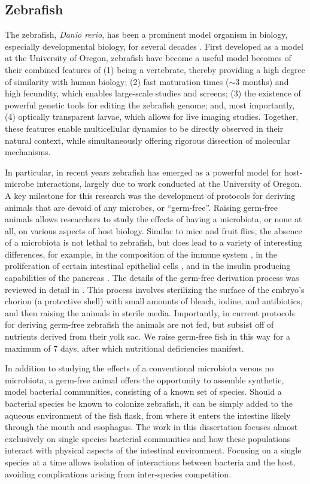 \subsection{Zebrafish}
The zebrafish, \textit{Danio rerio}, has been a prominent model organism in biology, especially developmental biology, for several decades \cite{streisinger1981production}. First developed as a model at the University of Oregon, zebrafish have become a useful model becomes of their combined features of (1) being a vertebrate, thereby providing a high degree of similarity with human biology; (2) fast maturation times ($\sim$3 months) and high fecundity, which enables large-scale studies and screens; (3) the existence of powerful genetic tools for editing the zebrafish genome; and, most importantly, (4) optically transparent larvae, which allows for live imaging studies. Together, these features enable multicellular dynamics to be directly observed in their natural context, while simultaneously offering rigorous dissection of molecular mechanisms. 

In particular, in recent years zebrafish has emerged as a powerful model for host-microbe interactions, largely due to work conducted at the University of Oregon. A key milestone for this research was the development of protocols for deriving animals that are devoid of any microbes, or “germ-free”. Raising germ-free animals allows researchers to study the effects of having a microbiota, or none at all, on various aspects of host biology. Similar to mice and fruit flies, the absence of a microbiota is not lethal to zebrafish, but does lead to a variety of interesting differences, for example, in the composition of the immune system \cite{rolig_individual_2015}, in the proliferation of certain intestinal epithelial cells \cite{bates2006distinct}, and in the insulin producing capabilities of the pancreas \cite{Hill2016}. The details of the germ-free derivation process was reviewed in detail in \cite{melancon_best_2017}. This process involves sterilizing the surface of the embryo's chorion (a protective shell) with small amounts of bleach, iodine, and antibiotics, and then raising the animals in sterile media. Importantly, in current protocols for deriving germ-free zebrafish the animals are not fed, but subsist off of nutrients derived from their yolk sac. We raise germ-free fish in this way for a maximum of 7 days, after which nutritional deficiencies manifest.

In addition to studying the effects of a conventional microbiota versus no microbiota,  a germ-free animal offers the opportunity to assemble synthetic, model bacterial communities, consisting of a known set of species. Should a bacterial species be known to colonize zebrafish, it can be simply added to the aqueous environment of the fish flask, from where it enters the intestine likely through the mouth and esophagus. The work in this dissertation focuses almost exclusively on single species bacterial communities and how these populations interact with physical aspects of the intestinal environment. Focusing on a single species at a time allows isolation of interactions between bacteria and the host, avoiding complications arising from inter-species competition. 

